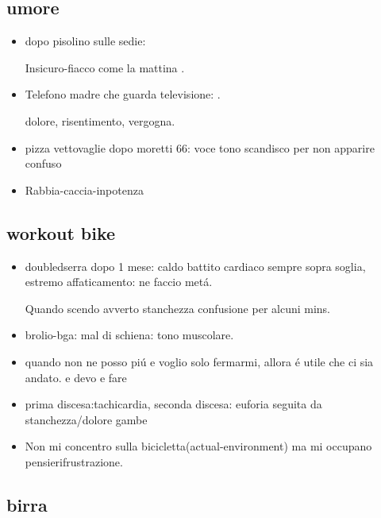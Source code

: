 \subsection{umore}

\begin{itemize}

\item dopo pisolino sulle sedie:

Insicuro-fiacco come la mattina .

\item Telefono madre che guarda televisione: .

dolore, risentimento, vergogna.

\item pizza vettovaglie dopo moretti 66: voce tono scandisco per non apparire confuso

\item Rabbia-caccia-inpotenza

\end{itemize}

\subsection{workout bike}

\begin{itemize}

\item doubledserra dopo 1 mese: caldo battito cardiaco sempre sopra soglia, estremo affaticamento: ne faccio met\'a.

Quando scendo avverto stanchezza confusione per alcuni mins.

\item brolio-bga: mal di schiena: tono muscolare.

\item quando non ne posso pi\'u e voglio solo fermarmi, allora \'e utile che ci sia andato. e devo  e fare 

\item prima discesa:tachicardia, seconda discesa: euforia seguita da stanchezza/dolore gambe

\item Non mi concentro sulla bicicletta(actual-environment) ma mi occupano pensierifrustrazione.

\end{itemize}


\subsection{birra}

